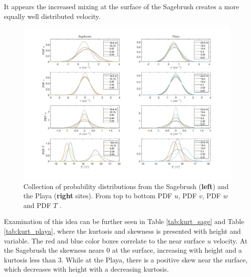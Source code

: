 \documentclass[]{article}
\begin{document}
It appears the increased mixing at the surface of the Sagebrush creates a more equally well distributed velocity. 



\begin{figure}
	\centering
	\includegraphics[width=\textwidth]{pdf}
	\caption{Collection of probability distributions from the Sagebrush (\textbf{left}) and the Playa (\textbf{right} sites). From top to bottom PDF $u$, PDF $v$,  PDF $w$ and PDF $T$ . }
	\label{fig:pdf}
\end{figure}
Examination of this idea can be further seen in Table \ref{tab:kurt_sage} and Table \ref{tab:kurt_playa}, where the kurtosis and skewness is presented with height and variable. The red and blue color boxes correlate to the near surface $u$ velocity. At the Sagebrush the skewness nears 0 at the surface, increasing with height and a kurtosis less than 3. While at the Playa, there is a positive skew near the surface, which decreases with height with a decreasing kurtosis. 
\end{document}
